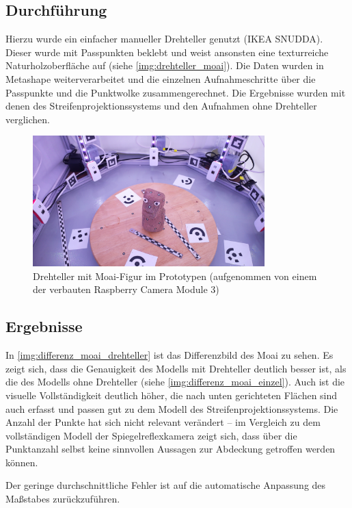 \documentclass[./00PhotoBox.tex]{subfiles}
\begin{document}
\subsection{Durchführung}
Hierzu wurde ein einfacher manueller Drehteller genutzt (IKEA SNUDDA). Dieser wurde mit Passpunkten beklebt und weist ansonsten eine texturreiche Naturholzoberfläche auf (siehe \autoref{img:drehteller_moai}). Die Daten wurden in Metashape weiterverarbeitet und die einzelnen Aufnahmeschritte über die Passpunkte und die Punktwolke zusammengerechnet. Die Ergebnisse wurden mit denen des Streifenprojektionssystems und den Aufnahmen ohne Drehteller verglichen.

\begin{figure}
    \centering
    \includegraphics[width=0.8\textwidth]{img/7_versuche/drehteller_moai.jpg}
    \caption{Drehteller mit Moai-Figur im Prototypen (aufgenommen von einem der verbauten Raspberry Camera Module 3)}
    \label{img:drehteller_moai}
\end{figure}

\subsection{Ergebnisse}

In \autoref{img:differenz_moai_drehteller} ist das Differenzbild des Moai zu sehen. Es zeigt sich, dass die Genauigkeit des Modells mit Drehteller deutlich besser ist, als die des Modells ohne Drehteller (siehe \autoref{img:differenz_moai_einzel}). Auch ist die visuelle Vollständigkeit deutlich höher, die nach unten gerichteten Flächen sind auch erfasst und passen gut zu dem Modell des Streifenprojektionssystems. Die Anzahl der Punkte hat sich nicht relevant verändert -- im Vergleich zu dem vollständigen Modell der Spiegelreflexkamera zeigt sich, dass über die Punktanzahl selbst keine sinnvollen Aussagen zur Abdeckung getroffen werden können.

Der geringe durchschnittliche Fehler ist auf die automatische Anpassung des Maßstabes zurückzuführen.
\end{document}
